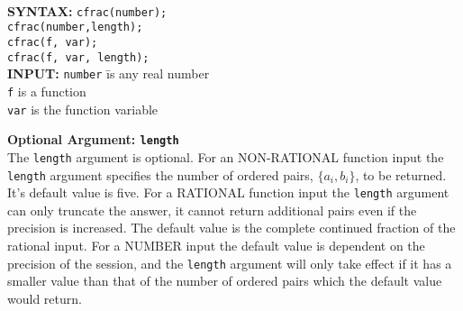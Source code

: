 \hypertarget{CONTFRAC:operator}{}
\hypertarget{CFRAC:operator}{}
\begin{tabbing}
\\
\textbf{SYNTAX:} \hspace{5mm} 
\= \texttt{cfrac(number);}\\
\> \texttt{cfrac(number,length);}\\
\> \texttt{cfrac(f, var);}\\
\> \texttt{cfrac(f, var, length);}\\[\baselineskip]

\textbf{INPUT:}
\> \texttt{number} \hspace{3mm} \= is any real number\\
\> \texttt{f}                   \> is a function\\
\> \texttt{var}                 \> is the function variable\\
\end{tabbing}

\textbf{Optional Argument: \texttt{length}}\\

The \texttt{length} argument is optional. 
For an NON-RATIONAL function input the \texttt{length} argument specifies
the number of ordered pairs, $\{a_i,b_i\}$, to be 
returned. It's default value is five.
For a RATIONAL function input the
\texttt{length} argument can only truncate the answer, it cannot
return additional pairs even if the precision is increased.
The default value is the complete continued fraction of the
rational input. For a NUMBER input the default value is 
dependent on the precision of the session, and the
\texttt{length} argument will only take effect if it has a smaller
value than that of the number of ordered pairs which the default
value would return.\\[\baselineskip]



